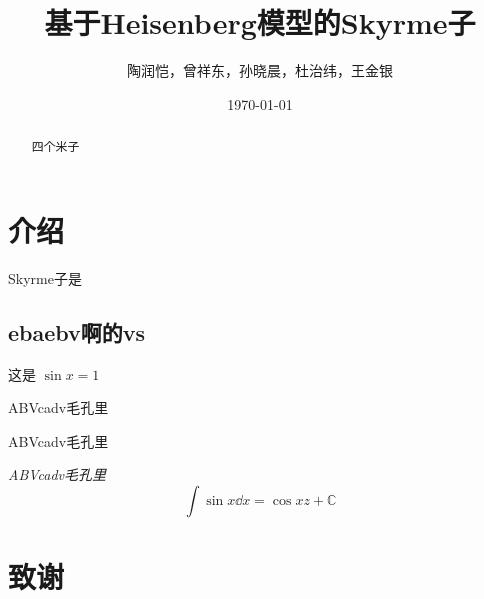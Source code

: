 \documentclass{ctexart}
\title{
	\vspace{-2 cm} \LARGE \bfseries
	基于Heisenberg模型的Skyrme子
}
\author{
	\CJKfamily{楷体}
	陶润恺，曾祥东，孙晓晨，杜治纬，王金银
}
\date{
	\CJKfamily{楷体}
	\today
}
\newcommand{\myHeavy}{\helvetica \CJKfamily{黑体}}
\newcommand{\emphA}[1]{{\myHeavy #1}}
\newcommand{\emphB}[1]{{\itshape #1}}
\newenvironment{myAbstract}
	{\begin{abstract} \normalsize}
	{\end{abstract}}
\begin{document}
	\maketitle
	
	\begin{myAbstract}
		四个米子
	\end{myAbstract}
	
	\section{介绍}
		Skyrme子是
		
		\subsection{ebaebv啊的vs}
		这是 $\sin x = 1$
		
		\textsf{ABVcadv毛孔里}
		
		\emphA{ABVcadv毛孔里}
		
		\emphB{ABVcadv毛孔里}
		\begin{equation}
			\int \sin x \dd x = \cos xz +\mathbb{C}
		\end{equation}
	
	\section{致谢}
\end{document}
